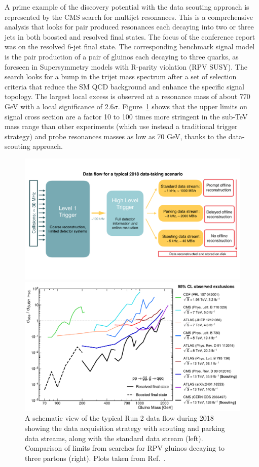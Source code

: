 \documentclass{moriond}
\begin{document}
A prime example of the discovery potential with the data scouting
approach is represented by the CMS search for multijet resonances. This is a
comprehensive analysis that looks for pair produced resonances each
decaying into two or three jets in both boosted and resolved final
states. The focus of the conference report was on the resolved 6-jet
final state. The corresponding benchmark signal model is the pair production of a pair
of gluinos each decaying to three quarks, as foreseen in Supersymmetry models
with R-parity violation (RPV SUSY). The search looks for a bump in the trijet
mass spectrum after a set of selection criteria that reduce the SM QCD
background and enhance the specific signal topology. The largest local
excess is observed at a resonance mass of about 770 GeV with a local significance of
2.6$\sigma$. Figure~\ref{fig:scouting} shows that the
upper limits on signal cross section are a factor 10 to 100 times more
stringent in the sub-TeV mass range than other experiments (which use instead a
traditional trigger strategy) and probe resonances masses as low as 70
GeV, thanks to the data-scouting approach.

\begin{figure}
\begin{minipage}{1.0\linewidth}
\centerline{\includegraphics[width=0.7\linewidth]{CMS-EXO-23-007_Figure_001.pdf}}
\end{minipage}
\hfill
\begin{minipage}{1.0\linewidth}
\centerline{\includegraphics[width=0.7\linewidth]{CMS-EXO-23-007_Figure_016.pdf}}
\end{minipage}
\caption[]{A schematic view of the typical Run 2 data flow during 2018
  showing the data acquisition strategy with scouting and parking data
  streams, along with the standard data stream (left). Comparison of
  limits from searches for RPV gluinos decaying to three partons
  (right). Plots taken from Ref.~\cite{CMS:2024zhe}.}
\label{fig:scouting}
\end{figure}
\end{document}
